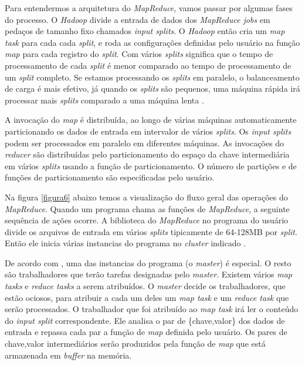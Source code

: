                 Para entendermos a arquitetura do \textit{MapReduce}, vamos passar por algumas fases do processo.
                O \textit{Hadoop} divide a entrada de dados dos \textit{MapReduce jobs} em pedaços de tamanho fixo
                chamados \textit{input splits}. O \textit{Hadoop} então cria um \textit{map task} para cada cada \textit{split},
                e roda as configurações definidas pelo usuário na função \textit{map} para cada registro do \textit{split}.
                Com vários \textit{splits} significa que o tempo de processamento de cada \textit{split} é menor
                comparado ao tempo de processamento de um \textit{split} completo. Se estamos processando os
                \textit{splits} em paralelo, o balanceamento de carga é mais efetivo, já quando os \textit{splits} são
                pequenos, uma máquina rápida irá processar mais \textit{splits} comparado a uma máquina lenta
                \cite{white2015}.

                A invocação do \textit{map} é distribuída, ao longo de várias máquinas automaticamente particionando
                os dados de entrada em intervalor de vários \textit{splits}. Os \textit{input splits} podem ser processados
                em paralelo em diferentes máquinas. As invocações do \textit{reducer} são distribuídas pelo
                particionamento do espaço da chave intermediária em vários \textit{splits} usando a função de
                particionamento. O número de partições e de funções de particionamento são especificadas pelo usuário.

                Na figura \ref{figura6} abaixo temos a visualização do fluxo geral das operações do \textit{MapReduce}.
                Quando um programa chama as funções de \textit{MapReduce}, a seguinte sequência de ações ocorre.
                A biblioteca do \textit{MapReduce} no programa do usuário divide os arquivos de entrada em vários
                \textit{splits} tipicamente de 64-128MB por \textit{split}. Então ele inicia várias instancias do programa
                no \textit{cluster} indicado \cite{dean2008}.

                De acordo com , uma das instancias do programa (o \textit{master}) é especial.
                O resto são trabalhadores que terão tarefas designadas pelo \textit{master}. Existem vários \textit{map tasks}
                e  \textit{reduce tasks} a serem atribuídos. O \textit{master} decide os trabalhadores, que estão ociosos,
                para atribuir a cada um deles um \textit{map task} e um \textit{reduce task} que serão processados. O
                trabalhador que foi atribuído ao \textit{map task} irá ler o conteúdo do \textit{input split} correspondente.
                Ele analisa o par de \{chave,valor\} dos dados de entrada e repassa cada par a função de \textit{map}
                definida pelo usuário. Os pares de {chave,valor} intermediários serão produzidos pela função de \textit{map}
                que está armazenada em \textit{buffer} na memória.

